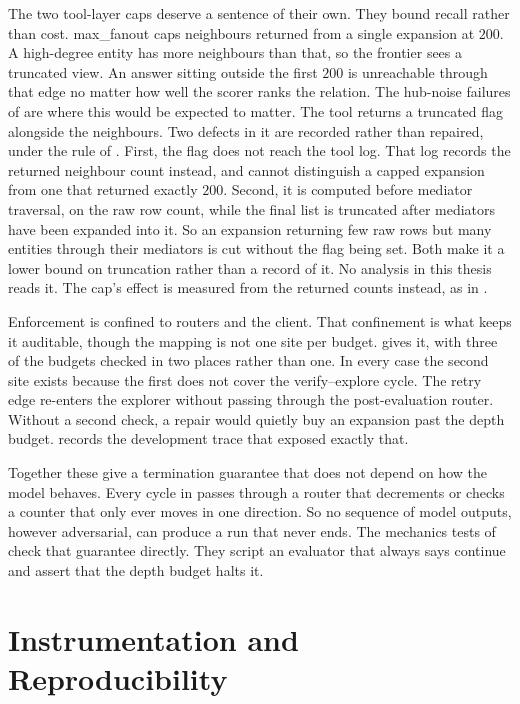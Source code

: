 The two tool-layer caps deserve a sentence of their own. They bound recall
rather than cost. \textsf{max\_fanout} caps neighbours returned from a single
expansion at $200$. A high-degree entity has more neighbours than that, so the
frontier sees a truncated view. An answer sitting outside the first $200$ is
unreachable through that edge no matter how well the scorer ranks the relation.
The hub-noise failures of  are where this would be expected to
matter. The tool returns a \textsf{truncated} flag alongside the neighbours. Two
defects in it are recorded rather than repaired, under the rule of
. First, the flag does not reach the tool log. That
log records the returned neighbour count instead, and cannot distinguish a
capped expansion from one that returned exactly $200$. Second, it is computed
before mediator traversal, on the raw row count, while the final list is
truncated after mediators have been expanded into it. So an expansion returning
few raw rows but many entities through their mediators is cut without the flag
being set. Both make it a lower bound on truncation rather than a record of it.
No analysis in this thesis reads it. The cap's effect is measured from the
returned counts instead, as in .

Enforcement is confined to routers and the client. That confinement is what
keeps it auditable, though the mapping is not one site per budget.
 gives it, with three of the budgets checked in two
places rather than one. In every case the second site exists because the first
does not cover the verify--explore cycle. The retry edge re-enters the explorer
without passing through the post-evaluation router. Without a second check, a
repair would quietly buy an expansion past the depth budget. 
records the development trace that exposed exactly that.

Together these give a termination guarantee that does not depend on how the
model behaves. Every cycle in  passes through a router
that decrements or checks a counter that only ever moves in one direction. So no
sequence of model outputs, however adversarial, can produce a run that never
ends. The mechanics tests of  check that guarantee
directly. They script an evaluator that always says \textsf{continue} and assert
that the depth budget halts it.

\section{Instrumentation and Reproducibility}\label{sec:instrumentation}

